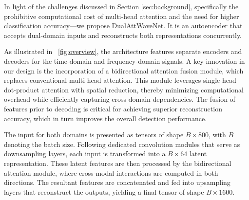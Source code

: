 \documentclass[conference]{IEEEtran}
\begin{document}

In light of the challenges discussed in Section \ref{sec:background}, specifically the prohibitive computational cost of multi-head attention and the need for higher classification accuracy—we propose DualAttWaveNet. It is an autoencoder that accepts dual-domain inputs and reconstructs both representations concurrently. 

As illustrated in \figurename~\ref{fig:overview}, the architecture features separate encoders and decoders for the time-domain and frequency-domain signals. A key innovation in our design is the incorporation of a bidirectional attention fusion module, which replaces conventional multi-head attention. This module leverages single-head dot-product attention with spatial reduction, thereby minimizing computational overhead while efficiently capturing cross-domain dependencies. The fusion of features prior to decoding is critical for achieving superior reconstruction accuracy, which in turn improves the overall detection performance.

The input for both domains is presented as tensors of shape $B \times 800$, with $B$ denoting the batch size. Following dedicated convolution modules that serve as downsampling layers, each input is transformed into a $B \times 64$ latent representation. These latent features are then processed by the bidirectional attention module, where cross-modal interactions are computed in both directions. The resultant features are concatenated and fed into upsampling layers that reconstruct the outputs, yielding a final tensor of shape $B \times 1600$.
\end{document}
